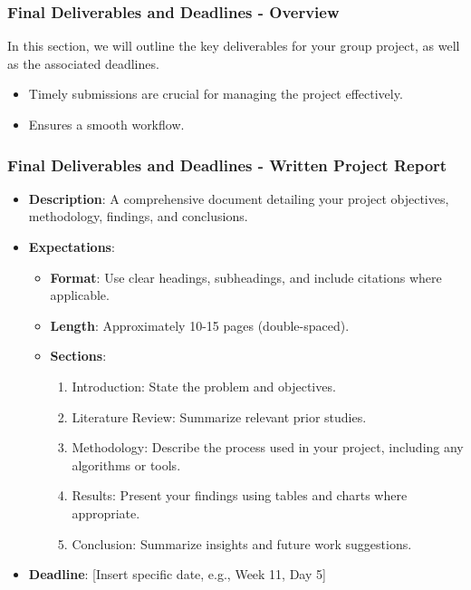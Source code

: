 \documentclass[aspectratio=169]{beamer}
\begin{document}
\begin{frame}[fragile]
    \frametitle{Final Deliverables and Deadlines - Overview}
    In this section, we will outline the key deliverables for your group project, as well as the associated deadlines. 
    \begin{itemize}
        \item Timely submissions are crucial for managing the project effectively.
        \item Ensures a smooth workflow.
    \end{itemize}
\end{frame}

\begin{frame}[fragile]
    \frametitle{Final Deliverables and Deadlines - Written Project Report}
    \begin{itemize}
        \item \textbf{Description}: A comprehensive document detailing your project objectives, methodology, findings, and conclusions.
        \item \textbf{Expectations}:
        \begin{itemize}
            \item \textbf{Format}: Use clear headings, subheadings, and include citations where applicable.
            \item \textbf{Length}: Approximately 10-15 pages (double-spaced).
            \item \textbf{Sections}:
            \begin{enumerate}
                \item Introduction: State the problem and objectives.
                \item Literature Review: Summarize relevant prior studies.
                \item Methodology: Describe the process used in your project, including any algorithms or tools.
                \item Results: Present your findings using tables and charts where appropriate.
                \item Conclusion: Summarize insights and future work suggestions.
            \end{enumerate}
        \end{itemize}
        \item \textbf{Deadline}: [Insert specific date, e.g., Week 11, Day 5]
    \end{itemize}
\end{frame}
\end{document}
